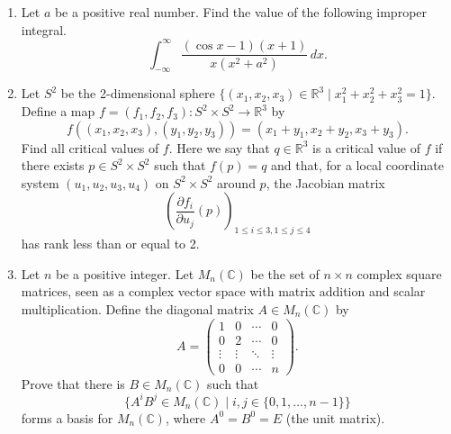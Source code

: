 \documentclass{article}
\begin{document}
\begin{enumerate}[label=\fbox{\arabic*}]
  \item Let $a$ be a positive real number. Find the value of the following improper integral.
        \[
          \int_{-\infty}^\infty \frac{(\cos x - 1)(x + 1)}{x(x^2 + a^2)} \, dx.
        \]

  \item Let $S^2$ be the 2-dimensional sphere $\{ (x_1, x_2, x_3) \in \mathbb{R}^3 \mid x_1^2 + x_2^2 + x_3^2 = 1 \}$. Define a map $f = (f_1, f_2, f_3) : S^2 \times S^2 \to \mathbb{R}^3$ by
        \[
          f((x_1, x_2, x_3), (y_1, y_2, y_3)) = (x_1 + y_1, x_2 + y_2, x_3 + y_3).
        \]
        Find all critical values of $f$. Here we say that $q \in \mathbb{R}^3$ is a critical value of $f$ if there exists $p \in S^2 \times S^2$ such that $f(p) = q$ and that, for a local coordinate system $(u_1, u_2, u_3, u_4)$ on $S^2 \times S^2$ around $p$, the Jacobian matrix
        \[
          \left( \frac{\partial f_i}{\partial u_j} (p) \right)_{1 \le i \le 3, 1 \le j \le 4}
        \]
        has rank less than or equal to 2.

  \item Let $n$ be a positive integer. Let $M_n(\mathbb{C})$ be the set of $n \times n$ complex square matrices, seen as a complex vector space with matrix addition and scalar multiplication. Define the diagonal matrix $A \in M_n(\mathbb{C})$ by
        \[
          A = \begin{pmatrix}
          1 & 0 & \cdots & 0 \\
          0 & 2 & \cdots & 0 \\
          \vdots & \vdots & \ddots & \vdots \\
          0 & 0 & \cdots & n
          \end{pmatrix}.
        \]
        Prove that there is $B \in M_n(\mathbb{C})$ such that
        \[
          \{ A^i B^j \in M_n(\mathbb{C}) \mid i, j \in \{0, 1, \dots, n-1\} \}
        \]
        forms a basis for $M_n(\mathbb{C})$, where $A^0 = B^0 = E$ (the unit matrix).
\end{enumerate}

\newpage
\end{document}
